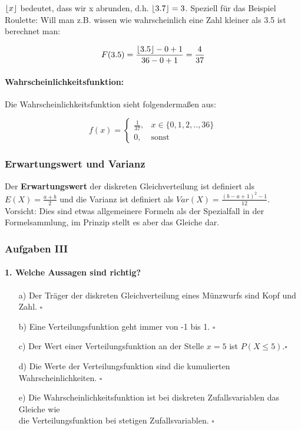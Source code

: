 \documentclass[a4paper]{article}
\DeclarePairedDelimiter\floor{\lfloor}{\rfloor}
\begin{document}
\noindent $\floor*{x}$ bedeutet, dass wir x abrunden, d.h. $\floor{3.7} = 3$. Speziell für das Beispiel Roulette: Will man z.B. wissen wie wahrscheinlich eine Zahl kleiner als 3.5 ist berechnet man:

\begin{equation*}
    F(3.5) = \frac{\floor*{3.5}-0+1}{36-0+1} = \frac{4}{37}
\end{equation*}


\paragraph{Wahrscheinlichkeitsfunktion:}
Die Wahrscheinlichkeitsfunktion sieht folgendermaßen aus:

\begin{equation*}
    f(x)=\begin{cases}
			\frac{1}{37}, & \text{$x \in \{0,1,2,..,36\}$}\\
            0, & \text{sonst}
		 \end{cases}
\end{equation*}


\subsubsection{Erwartungswert und Varianz} \label{sec:Expec}
Der \textbf{Erwartungswert} der diskreten Gleichverteilung ist definiert als $E(X) = \frac{a+b}{2}$ und die Varianz ist definiert als $Var(X) = \frac{(b-a+1)^2-1}{12}$. Vorsicht: Dies sind etwas allgemeinere Formeln als der Spezialfall in der Formelsammlung, im Prinzip stellt es aber das Gleiche dar.

\clearpage

\subsubsection{Aufgaben III}
\paragraph{1. Welche Aussagen sind richtig?}
\begin{itemize}
    \item[a)] Der Träger der diskreten Gleichverteilung eines Münzwurfs sind Kopf und Zahl. \hfill $\square$
    \item[b)] Eine Verteilungsfunktion geht immer von -1 bis 1. \hfill $\square$
    \item[c)] Der Wert einer Verteilungsfunktion an der Stelle $x=5$ ist $P(X\leq 5)$.\hfill $\square$
    \item[d)] Die Werte der Verteilungsfunktion sind die kumulierten Wahrscheinlichkeiten. \hfill $\square$
    \item[e)] Die Wahrscheinlichkeitsfunktion ist bei diskreten Zufallsvariablen das Gleiche wie \\die Verteilungsfunktion bei stetigen Zufallsvariablen. \hfill $\square$
\end{itemize}
\end{document}
